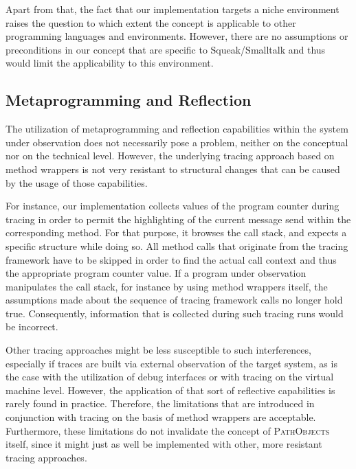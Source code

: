 Apart from that, the fact that our implementation targets a niche environment raises the question to which extent the concept is applicable to other programming languages and environments.
However, there are no assumptions or preconditions in our concept that are specific to  Squeak/Smalltalk and thus would limit the applicability to this environment.

\subsection{Metaprogramming and Reflection}
\label{ss:DiscussionLimitationsMeta}
The utilization of metaprogramming and reflection capabilities within the system under observation does not necessarily pose a problem, neither on the conceptual nor on the technical level.
However, the underlying tracing approach based on method wrappers is not very resistant to structural changes that can be caused by the usage of those capabilities.

For instance, our implementation collects values of the program counter during tracing in order to permit the highlighting of the current message send within the corresponding method.
For that purpose, it browses the call stack, and expects a specific structure while doing so.
All method calls that originate from the tracing framework have to be skipped in order to find the actual call context and thus the appropriate program counter value.
If a program under observation manipulates the call stack, for instance by using method wrappers itself, the assumptions made about the sequence of tracing framework calls no longer hold true.
Consequently, information that is collected during such tracing runs would be incorrect.

Other tracing approaches might be less susceptible to such interferences, especially if traces are built via external observation of the target system, as is the case with the utilization of debug interfaces or with tracing on the virtual machine level.
However, the application of that sort of reflective capabilities is rarely found in practice.
Therefore, the limitations that are introduced in conjunction with tracing on the basis of method wrappers are acceptable.
Furthermore, these limitations do not invalidate the concept of \textsc{PathObjects} itself, since it might just as well be implemented with other, more resistant tracing approaches.

